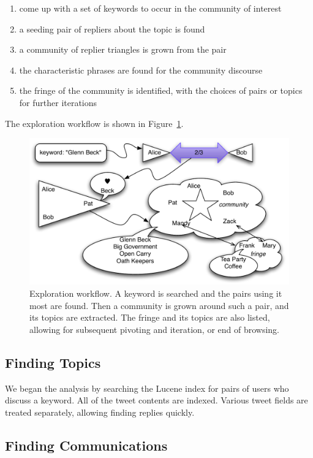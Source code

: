 \begin{enumerate}
	\item come up with a set of keywords to occur in the community of interest
	\item a seeding pair of repliers about the topic is found
	\item a community of replier triangles is grown from the pair
	\item the characteristic phrases are found for the community discourse
	\item the fringe of the community is identified, with the choices of pairs or topics for further iterations
\end{enumerate}

The exploration workflow is shown in Figure~\ref{figure:workflow}.  

\begin{figure}[htp]
\includegraphics{figures/spie-workflow}
\caption{Exploration workflow.  A keyword is searched and the pairs using it most are found.  Then a community is grown around such a pair, and its topics are extracted.  The fringe and its topics are also listed, allowing for subsequent pivoting and iteration, or end of browsing.}
\label{figure:workflow}
\end{figure}
	
\subsection{Finding Topics}

We began the analysis by searching the Lucene index for pairs of users who discuss a keyword.  All of the tweet contents are indexed.  Various tweet fields are treated separately, allowing finding replies quickly.

\subsection{Finding Communications}

